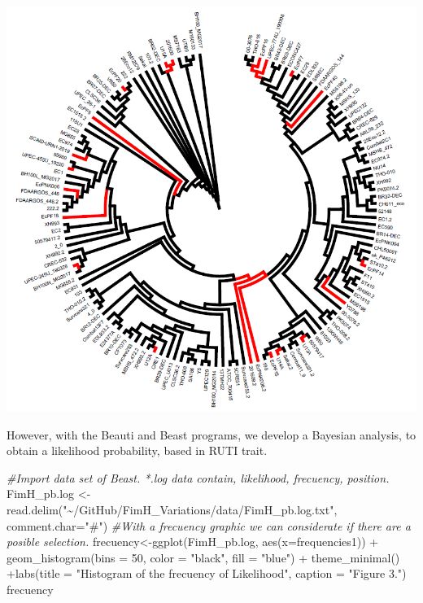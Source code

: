 \documentclass[
]{article}
\newenvironment{Shaded}{\begin{snugshade}}{\end{snugshade}}
\newcommand{\AttributeTok}[1]{\textcolor[rgb]{0.77,0.63,0.00}{#1}}
\newcommand{\CommentTok}[1]{\textcolor[rgb]{0.56,0.35,0.01}{\textit{#1}}}
\newcommand{\DecValTok}[1]{\textcolor[rgb]{0.00,0.00,0.81}{#1}}
\newcommand{\FunctionTok}[1]{\textcolor[rgb]{0.00,0.00,0.00}{#1}}
\newcommand{\NormalTok}[1]{#1}
\newcommand{\OtherTok}[1]{\textcolor[rgb]{0.56,0.35,0.01}{#1}}
\newcommand{\SpecialCharTok}[1]{\textcolor[rgb]{0.00,0.00,0.00}{#1}}
\newcommand{\StringTok}[1]{\textcolor[rgb]{0.31,0.60,0.02}{#1}}
\begin{document}
\includegraphics{images/tree-02.jpg}

However, with the Beauti and Beast programs, we develop a Bayesian
analysis, to obtain a likelihood probability, based in RUTI trait.

\begin{Shaded}
\begin{Highlighting}[]
\CommentTok{\#Import data set of Beast. *.log data contain, likelihood, frecuency, position.}
\NormalTok{FimH\_pb.log }\OtherTok{\textless{}{-}} \FunctionTok{read.delim}\NormalTok{(}\StringTok{"\textasciitilde{}/GitHub/FimH\_Variations/data/FimH\_pb.log.txt"}\NormalTok{, }\AttributeTok{comment.char=}\StringTok{"\#"}\NormalTok{)}
\CommentTok{\#With a frecuency graphic we can considerate if there are a posible selection.}
\NormalTok{frecuency}\OtherTok{\textless{}{-}}\FunctionTok{ggplot}\NormalTok{(FimH\_pb.log, }\FunctionTok{aes}\NormalTok{(}\AttributeTok{x=}\NormalTok{frequencies1)) }\SpecialCharTok{+} \FunctionTok{geom\_histogram}\NormalTok{(}\AttributeTok{bins =} \DecValTok{50}\NormalTok{, }\AttributeTok{color =} \StringTok{"black"}\NormalTok{, }\AttributeTok{fill =} \StringTok{"blue"}\NormalTok{) }\SpecialCharTok{+} \FunctionTok{theme\_minimal}\NormalTok{() }\SpecialCharTok{+}\FunctionTok{labs}\NormalTok{(}\AttributeTok{title =} \StringTok{"Histogram of the frecuency of Likelihood"}\NormalTok{, }\AttributeTok{caption =} \StringTok{"Figure 3."}\NormalTok{)}
\NormalTok{frecuency}
\end{Highlighting}
\end{Shaded}
\end{document}
